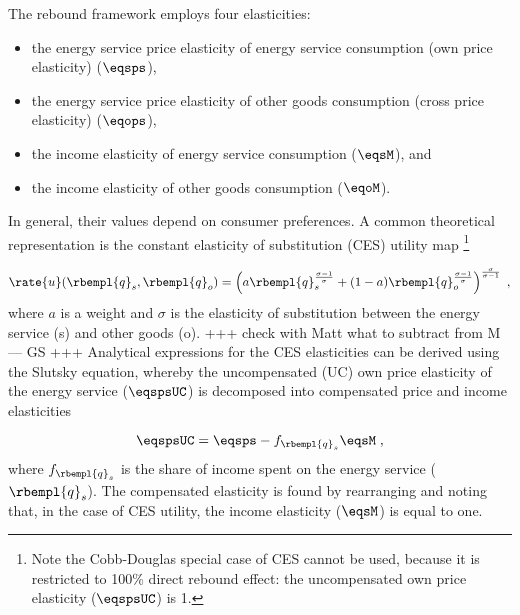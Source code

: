 

The rebound framework employs four elasticities:
%
\begin{itemize}

  \item the energy service price elasticity of energy service consumption (own price elasticity) ($\eqsps$),

  \item the energy service price elasticity of other goods consumption (cross price elasticity) ($\eqops$), 
  
  \item the income elasticity of energy service consumption ($\eqsM$), and 
  
  \item the income elasticity of other goods consumption ($\eqoM$).

\end{itemize}
%
In general, their values depend on consumer preferences.
A common theoretical representation is
the constant elasticity of substitution (CES)
utility map \citep{Lemoine:2020aa}%
\footnote{
  Note the Cobb-Douglas special case of CES cannot be used, because
  it is restricted to 100\% direct rebound effect: 
  the uncompensated own price elasticity ($\eqspsUC$) is 1.
}

\begin{equation}
  \rate{u}(\rbempl{q}_s,\rbempl{q}_o) = 
      \left( a \rbempl{q}_s^{\frac{\sigma-1}{\sigma}} + (1-a) \rbempl{q}_o^{\frac{\sigma-1}{\sigma}}\right)                ^{\frac{\sigma}{\sigma-1}} \; ,
\end{equation}
%
where $a$ is a weight and $\sigma$ is the elasticity of substitution between 
the energy service (s) and other goods (o). 
+++ check with Matt what to subtract from M --- GS +++
Analytical expressions for the CES elasticities can be derived using the Slutsky equation, 
whereby the uncompensated (UC) own price elasticity 
of the energy service ($\eqspsUC$) 
is decomposed into compensated price and income elasticities

\begin{equation}
  \eqspsUC = \eqsps - f_{\rbempl{q}_s} \eqsM \; ,
\end{equation}
%
where $f_{\rbempl{q}_s}$ is the share of income spent 
on the energy service ($\rbempl{q}_s$). 
The compensated elasticity is found by rearranging and noting that, 
in the case of CES utility, 
the income elasticity ($\eqsM$) is equal to one. 

